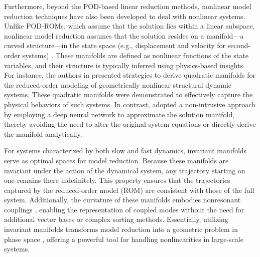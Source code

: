 \documentclass[11pt]{article}
\begin{document}
    Furthermore, beyond the POD-based linear reduction methods, nonlinear model reduction techniques \cite{Amsallem_2012,hahn2002improved,dong2003piecewise,carlberg2013gnat,carlberg2015preserving,chaturantabut2012state,rowley2017model,daronch2012nonlinear} have also been developed to deal with nonlinear systems.
    Unlike POD-ROMs, which assume that the solution lies within a linear subspace, nonlinear model reduction \cite{Touz__2021,shaw1991non-linear,Chen_1996,daniel2022physics,borggaard2016goal} assumes that the solution resides on a manifold—a curved structure—in the state space (e.g., displacement and velocity for second-order systems) \cite{glad2018control,trentelman2002control}.
    These manifolds are defined as nonlinear functions of the state variables, and their structure is typically inferred using physics-based insights.
    For instance, the authors in \cite{Rutzmoser_2017,jain2017quadratic} presented strategies to derive quadratic manifolds for the reduced-order modeling of geometrically nonlinear structural dynamic systems.
    These quadratic manifolds were demonstrated to effectively capture the physical behaviors of such systems.
    In contrast, \cite{kim2022fast} adopted a non-intrusive approach by employing a deep neural network to approximate the solution manifold, thereby avoiding the need to alter the original system equations or directly derive the manifold analytically.


    For systems characterized by both slow and fast dynamics, invariant manifolds \cite{gorban2004constructive,cabre2005parameterization,shaw1991non-linear,simo1989analytical,guckenheimer2004fast,ascher1994stabilization} serve as optimal spaces for model reduction.
    Because these manifolds are invariant under the action of the dynamical system, any trajectory starting on one remains there indefinitely.
    This property ensures that the trajectories captured by the reduced-order model (ROM) are consistent with those of the full system.
    Additionally, the curvature of these manifolds embodies nonresonant couplings \cite{shami2022nonlinear,Touz__2021,Lacarbonara_2003}, enabling the representation of coupled modes without the need for additional vector bases or complex sorting methods.
    Essentially, utilizing invariant manifolds transforms model reduction into a geometric problem in phase space \cite{nolte2010tangled,cenedese2022data}, offering a powerful tool for handling nonlinearities in large-scale systems.
\end{document}
